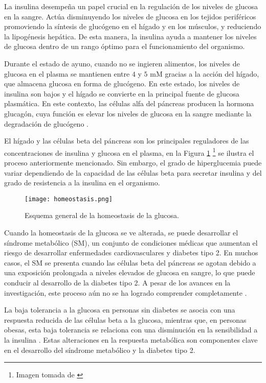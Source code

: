 La insulina desempeña un papel crucial en la regulación de los niveles de glucosa en la sangre. Actúa disminuyendo los niveles de glucosa en los tejidos periféricos promoviendo la síntesis de glucógeno en el hígado y en los músculos, y reduciendo la lipogénesis hepática. De esta manera, la insulina ayuda a mantener los niveles de glucosa dentro de un rango óptimo para el funcionamiento del organismo.

Durante el estado de ayuno, cuando no se ingieren alimentos, los niveles de glucosa en el plasma se mantienen entre $4$ y $5$ mM gracias a la acción del hígado, que almacena glucosa en forma de glucógeno. En este estado, los niveles de insulina son bajos y el hígado se convierte en la principal fuente de glucosa plasmática. En este contexto, las células alfa del páncreas producen la hormona glucagón, cuya función es elevar los niveles de glucosa en la sangre mediante la degradación de glucógeno \cite{unamHomeostasis}.

El hígado y las células beta del páncreas son los principales reguladores de las concentraciones de insulina y glucosa en el plasma, en la Figura \ref{fig:homeostasis} \footnote{Imagen tomada de \cite{ImgHomeos}} se ilustra el proceso anteriormente mencionado. Sin embargo, el grado de hiperglucemia puede variar dependiendo de la capacidad de las células beta para secretar insulina y del grado de resistencia a la insulina en el organismo.

\begin{figure}[H]
    \centering
    \texttt{[image: homeostasis.png]}
    \caption{Esquema general de la homeostasis de la glucosa.}
    \label{fig:homeostasis}
\end{figure}

Cuando la homeostasis de la glucosa se ve alterada, se puede desarrollar el síndrome metabólico (SM), un conjunto de condiciones médicas que aumentan el riesgo de desarrollar enfermedades cardiovasculares y diabetes tipo 2. En muchos casos, el SM se presenta cuando las células beta del páncreas se agotan debido a una exposición prolongada a niveles elevados de glucosa en sangre, lo que puede conducir al desarrollo de la diabetes tipo 2. A pesar de los avances en la investigación, este proceso aún no se ha logrado comprender completamente \cite{capitulo4Metabolic}.

La baja tolerancia a la glucosa en personas sin diabetes se asocia con una respuesta reducida de las células beta a la glucosa, mientras que, en personas obesas, esta baja tolerancia se relaciona con una disminución en la sensibilidad a la insulina \cite{computational}. Estas alteraciones en la respuesta metabólica son componentes clave en el desarrollo del síndrome metabólico y la diabetes tipo 2.

